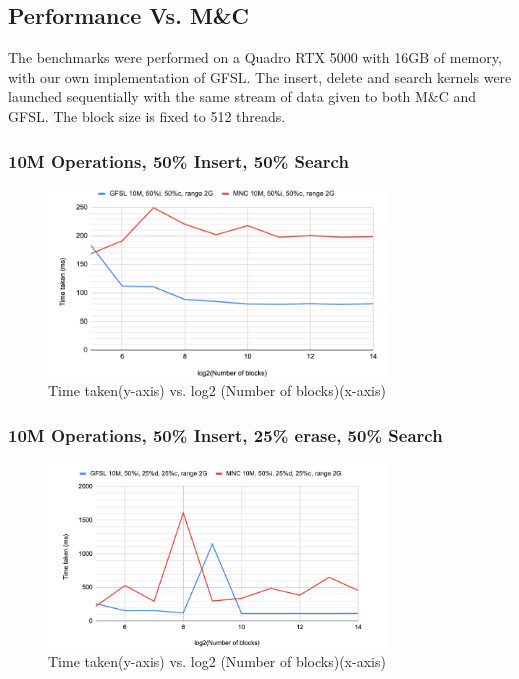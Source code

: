\documentclass[12pt,a4paper]{article}
\begin{document}
\subsection{Performance Vs. M\&C}
The benchmarks were performed on a Quadro RTX 5000 with 16GB of memory, with our own implementation of GFSL. The insert, delete and search kernels were launched sequentially with the same stream of data given to both M\&C and GFSL. The block size is fixed to 512 threads.

\subsubsection{10M Operations, 50\% Insert, 50\% Search}
\begin{figure}[H]
    \centering
    \includegraphics[width=0.8\textwidth]{5.png}
    \caption{Time taken(y-axis) vs. log2 (Number of blocks)(x-axis)}
\end{figure}

\subsubsection{10M Operations, 50\% Insert, 25\% erase, 50\% Search}
\begin{figure}[H]
    \centering
    \includegraphics[width=0.8\textwidth]{6.png}
    \caption{Time taken(y-axis) vs. log2 (Number of blocks)(x-axis)}
\end{figure}
\end{document}
